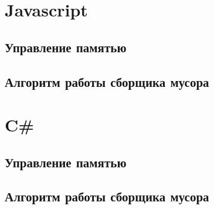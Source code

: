 \section{Javascript}
\subsection{Управление памятью}
\subsection{Алгоритм работы сборщика мусора}

%
%
%
%
%
%
%
%
%
%
%
%
%
%
%





\section{C\#}
\subsection{Управление памятью}
\subsection{Алгоритм работы сборщика мусора}
%
%
%
%
%
%
%
%
%
%
%
%





